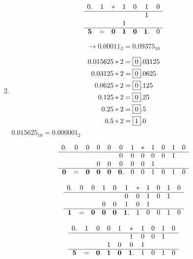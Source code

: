 \documentclass{article}
\begin{document}
\begin{enumerate}[a)]
\begin{enumerate}[1)]
    \[
      \begin{array}{cccc ccc}
        0.&1&*&1&0&1&0 \\
        \cline{0-6}
          & & & & &1 \\
          & & &1 \\
        \cline{0-6}
        \bm{5}&=&\bm{0}&\bm{1}&\bm{0}&\bm{1}.&0 \\
      \end{array}
    \]

    \[
      \rightarrow 0.0 0011_2 = 0.09375_{10}
    \]

  \item
    \begin{align*}
      0.015625 * 2 &= \framebox{0}.03125 \\
      0.03125  * 2 &= \framebox{0}.0625 \\
      0.0625   * 2 &= \framebox{0}.125 \\
      0.125    * 2 &= \framebox{0}.25 \\
      0.25     * 2 &= \framebox{0}.5 \\
      0.5      * 2 &= \framebox{1}.0 \\
    \end{align*}
    $0.015625_{10} = 0.000001_{2}$

    \[
      \begin{array}{cccc cccc cccc}
        0.&0&0&0&0&0&1&*&1&0&1&0 \\
        \cline{0-11}
          & & & & &0&0&0&0&0&1\\
          & & &0&0&0&0&0&1& \\
        \cline{0-11}
        \bm{0}&=&\bm{0}&\bm{0}&\bm{0}&\bm{0}.&0&0&1&0&1&0 \\
      \end{array}
    \]

    \[
      \begin{array}{cccc cccc ccc}
        0.&0&0&1&0&1&*&1&0&1&0 \\
        \cline{0-10}
          & & & & &0&0&1&0&1\\
          & & &0&0&1&0&1& \\
        \cline{0-10}
        \bm{1}&=&\bm{0}&\bm{0}&\bm{0}&\bm{1}.&1&0&0&1&0 \\
      \end{array}
    \]

    \[
      \begin{array}{cccc cccc cc}
        0.&1&0&0&1&*&1&0&1&0 \\
        \cline{0-9}
          & & & & &1&0&0&1\\
          & & &1&0&0&1& \\
        \cline{0-9}
        \bm{5}&=&\bm{0}&\bm{1}&\bm{0}&\bm{1}.&1&0&1&0 \\
      \end{array}
    \]


\end{enumerate}
\end{enumerate}
\end{document}
